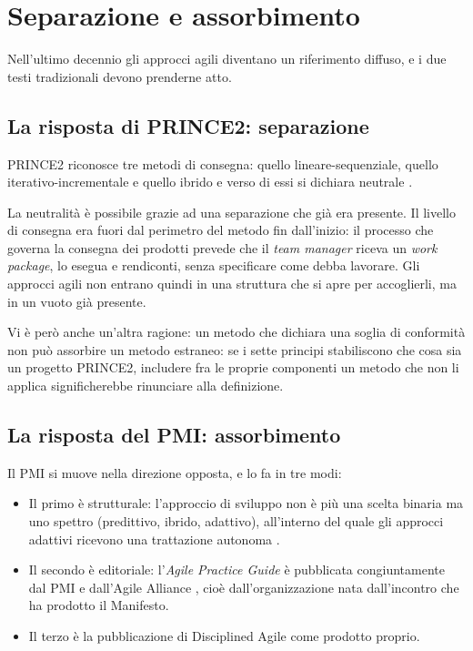 
\section{Separazione e assorbimento}
\label{sec:strategie}

Nell'ultimo decennio gli approcci agili diventano un
riferimento diffuso, e i due testi tradizionali devono
prenderne atto.

\subsection{La risposta di PRINCE2: separazione}

PRINCE2 riconosce tre metodi di consegna: quello lineare-sequenziale, quello
iterativo-incrementale e quello ibrido e verso di essi si dichiara neutrale \cite{prince27}.

La neutralit\`a \`e possibile grazie ad una separazione che gi\`a era presente.
Il livello di consegna era fuori dal perimetro del metodo fin
dall'inizio: il processo che governa la consegna dei prodotti prevede che il
\emph{team manager} riceva un \emph{work package}, lo esegua e rendiconti,
senza specificare come debba lavorare. Gli approcci agili non entrano
quindi in una struttura che si apre per accoglierli, ma in un vuoto
gi\`a presente.

Vi \`e per\`o anche un'altra ragione: un
metodo che dichiara una soglia di conformit\`a non pu\`o assorbire un metodo
estraneo: se i sette principi
stabiliscono che cosa sia un progetto PRINCE2, includere fra le proprie
componenti un metodo che non li applica significherebbe rinunciare alla
definizione.

\subsection{La risposta del PMI: assorbimento}

Il PMI si muove nella direzione opposta, e lo fa in tre modi:
\begin{itemize}
    \item Il primo \`e strutturale: l'approccio di sviluppo non \`e pi\`u una scelta
    binaria ma uno spettro (predittivo, ibrido, adattivo), all'interno del quale
    gli approcci adattivi ricevono una trattazione autonoma \cite{pmbok8}.

    \item  Il secondo \`e editoriale:
l'\emph{Agile Practice Guide} \`e pubblicata congiuntamente dal PMI e
dall'Agile Alliance \cite{agilepracticeguide2}, cio\`e dall'organizzazione nata
dall'incontro che ha prodotto il Manifesto.

    \item Il terzo \`e la pubblicazione di
Disciplined Agile come prodotto proprio.

\end{itemize}

